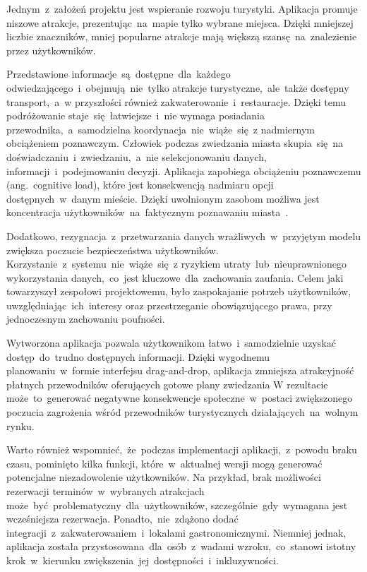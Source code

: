 \indent Jednym~z~założeń projektu jest wspieranie rozwoju turystyki.
Aplikacja promuje niszowe atrakcje, prezentując~na~mapie tylko wybrane miejsca.
Dzięki mniejszej liczbie znaczników, mniej popularne atrakcje mają większą szansę~na~znalezienie przez użytkowników.

\indent Przedstawione informacje~są~dostępne~dla~każdego odwiedzającego~i~obejmują~nie~tylko atrakcje turystyczne,~ale~także dostępny transport,~a~w przyszłości również zakwaterowanie~i~restauracje.
Dzięki temu podróżowanie staje~się~łatwiejsze~i~nie wymaga posiadania przewodnika,~a~samodzielna koordynacja~nie~wiąże~się~z nadmiernym obciążeniem poznawczym. \newline
Człowiek podczas zwiedzania miasta skupia~się~na doświadczaniu~i~zwiedzaniu,~a~nie selekcjonowaniu danych, informacji~i~podejmowaniu decyzji.
Aplikacja zapobiega obciążeniu poznawczemu (ang.\ cognitive load), które jest konsekwencją nadmiaru opcji dostępnych~w~danym mieście.
Dzięki \textquoteopen uwolnionym zasobom \textquoteclose możliwa jest koncentracja użytkowników~na~faktycznym poznawaniu miasta~\cite{cognitive-biases}.

\indent Dodatkowo, rezygnacja~z~przetwarzania danych wrażliwych~w~przyjętym modelu zwiększa poczucie bezpieczeństwa użytkowników.
Korzystanie~z~systemu~nie~wiąże~się~z ryzykiem utraty~lub~nieuprawnionego wykorzystania danych,~co~jest kluczowe~dla~zachowania zaufania.
Celem jaki towarzyszył zespołowi projektowemu, było zaspokajanie potrzeb użytkowników, uwzględniając~ich~interesy oraz przestrzeganie obowiązującego prawa, przy jednoczesnym zachowaniu poufności.

\indent Wytworzona aplikacja pozwala użytkownikom łatwo~i~samodzielnie uzyskać dostęp~do~trudno dostępnych informacji.
Dzięki wygodnemu planowaniu~w~formie interfejsu drag-and-drop, aplikacja zmniejsza atrakcyjność płatnych przewodników oferujących gotowe plany zwiedzania
W rezultacie może~to~generować negatywne konsekwencje społeczne~w~postaci zwiększonego poczucia zagrożenia wśród przewodników turystycznych działających~na~wolnym rynku.

\indent Warto również wspomnieć,~że~podczas implementacji aplikacji,~z~powodu braku czasu, pominięto kilka funkcji, które~w~aktualnej wersji mogą generować potencjalne niezadowolenie użytkowników.
Na przykład, brak możliwości rezerwacji terminów~w~wybranych atrakcjach może~być~problematyczny~dla~użytkowników, szczególnie~gdy~wymagana jest wcześniejsza rezerwacja.
Ponadto,~nie~zdążono dodać integracji~z~zakwaterowaniem~i~lokalami gastronomicznymi.
Niemniej jednak, aplikacja została przystosowana~dla~osób~z~wadami wzroku,~co~stanowi istotny krok~w~kierunku zwiększenia~jej~dostępności~i~inkluzywności.

